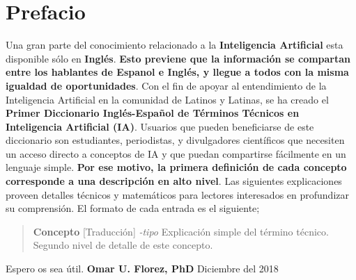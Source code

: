 \documentclass[twoside]{book}
\begin{document}
\chapter{Prefacio}
\begin{flushleft}
Una gran parte del conocimiento relacionado a la \textbf{Inteligencia Artificial} esta disponible sólo en \textbf{Inglés}. \textbf{Esto previene que la información se compartan entre los hablantes de Espanol e Inglés, y llegue a todos con la misma igualdad de oportunidades}. 
\linebreak \linebreak 
Con el fin de apoyar al entendimiento de la Inteligencia Artificial en la comunidad de Latinos y Latinas, se ha creado el \textbf{Primer Diccionario Inglés-Español de Términos Téc\-nicos en Inteligencia Artificial (IA)}.  
Usuarios que pueden beneficiarse de este diccionario son estudiantes, periodistas, y divulgadores científicos que necesiten un acceso directo a conceptos de IA y que puedan compartirse  fácilmente en un lenguaje simple.
\linebreak \linebreak 
\textbf{Por ese motivo, la primera definición de cada concepto corresponde a una descripción en alto nivel}. Las siguientes explicaciones proveen detalles técnicos y matemáticos para lectores interesados en profundizar su comprensión. El formato de cada entrada es el siguiente;

\begin{verse}
\textbf{Concepto} [Traducción] \textit{-tipo} Explicación simple del término técnico. Segundo nivel de detalle de este concepto.
\end{verse}

Espero os sea útil. \linebreak \linebreak 
\textbf{Omar U. Florez, PhD}
\linebreak 
Diciembre del 2018
\end{flushleft}
\let\cleardoublepage\clearpage
\end{document}
